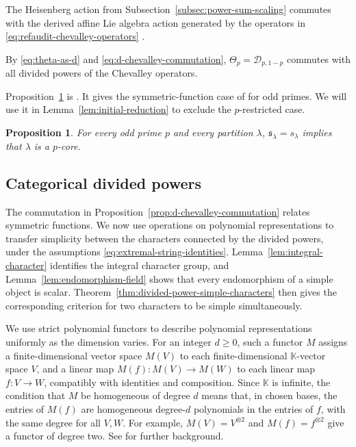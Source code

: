 \documentclass[12pt,reqno,a4paper]{amsart}
\numberwithin{equation}{section}
\numberwithin{figure}{section}
\theoremstyle{plain}
\newtheorem{proposition}[theorem]{Proposition}
\theoremstyle{definition}
\begin{document}
The Heisenberg action from Subsection~\ref{subsec:power-sum-scaling}
commutes with the derived affine Lie algebra action generated by the
operators in \eqref{eq:refaudit-chevalley-operators}
\cite[Section~2.3 and Lemma~2.4(2)]{HongYacobi}.

By \eqref{eq:theta-as-d} and \eqref{eq:d-chevalley-commutation},
$\Theta_p=\mathcal D_{p,1-p}$ commutes with all divided powers of
the Chevalley operators.

Proposition~\ref{cor:walker-conjecture-47} is
\cite[Theorem~8.11]{JingLiuSkewMN}.  It gives the symmetric-function
case of \cite[Conjecture~4.7]{Walker} for odd primes.  We will use it in
Lemma~\ref{lem:initial-reduction} to exclude the $p$-restricted case.

\begin{proposition}
\label{cor:walker-conjecture-47}
For every odd prime $p$ and every partition $\lambda$,
$\mathfrak{s}_\lambda=s_\lambda$ implies that $\lambda$ is a $p$-core.
\end{proposition}

\subsection{Categorical divided powers}
\label{subsec:divided-powers}

The commutation in Proposition~\ref{prop:d-chevalley-commutation}
relates symmetric functions.  We now use operations on polynomial
representations to transfer simplicity between the characters
connected by the divided powers, under the assumptions
\eqref{eq:extremal-string-identities}.  Lemma~\ref{lem:integral-character}
identifies the integral character group, and
Lemma~\ref{lem:endomorphism-field} shows that every endomorphism
of a simple object is scalar.
Theorem~\ref{thm:divided-power-simple-characters} then gives the
corresponding criterion for two characters to be simple
simultaneously.

We use strict polynomial functors to describe polynomial
representations uniformly as the dimension varies.  For an integer
$d\geq0$, such a functor $M$ assigns a finite-dimensional vector space
$M(V)$ to each finite-dimensional $\mathbb K$-vector space $V$, and
a linear map $M(f):M(V)\to M(W)$ to each linear map $f:V\to W$,
compatibly with identities and composition.  Since $\mathbb K$ is
infinite, the condition that $M$ be homogeneous of degree $d$ means
that, in chosen bases, the entries of $M(f)$ are homogeneous
degree-$d$ polynomials in the entries of $f$, with the same degree
for all $V,W$.  For example, $M(V)=V^{\otimes2}$ and
$M(f)=f^{\otimes2}$ give a functor of degree two.  See
\cite[Sections~4.1--4.3]{HTY} for further background.
\end{document}
